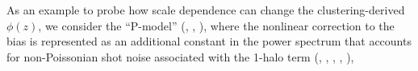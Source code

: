 \documentclass[a4paper,usenatbib]{mnras}
\begin{document}
As an example to probe how scale dependence can change the clustering-derived $\phi(z)$, we consider  the ``P-model'' (\citealt{Smith++07}, \citealt{Hamann++08}, \citealt{CresswellPercival09}), where the nonlinear correction to the bias is represented as an additional constant in the power spectrum that accounts for non-Poissonian shot noise associated with the 1-halo term (\citealt{PeacockSmith00}, \citealt{Seljak00}, \citealt{SchulzWhite06}, \citealt{Guzik++07}, \citealt{WechslerTinker18}),
\end{document}
